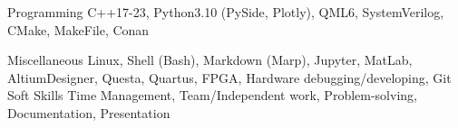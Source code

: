 

\begin{cvskills}

  \cvskill
    {Programming} %
    {C++17-23, Python3.10 (PySide, Plotly), QML6, SystemVerilog, CMake, MakeFile, Conan} %

  \cvskill
    {Miscellaneous} %
    {Linux, Shell (Bash), Markdown (Marp), Jupyter, MatLab, AltiumDesigner, Questa, Quartus, FPGA, Hardware debugging/developing, Git} %
  \cvskill
    {Soft Skills} %
    {Time Management, Team/Independent work, Problem-solving, Documentation, Presentation} %

\end{cvskills}
